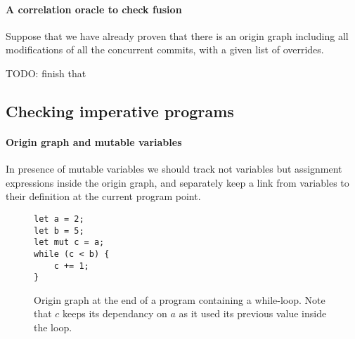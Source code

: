 \documentclass[a4paper,10pt]{article}
\begin{document}
\paragraph{A correlation oracle to check fusion} Suppose that we have already proven that there is an origin graph including all modifications of all the concurrent commits, with a given list of overrides.

TODO: finish that

\subsection{Checking imperative programs}

\paragraph{Origin graph and mutable variables} In presence of mutable variables we should track not variables but assignment expressions inside the origin graph, and separately keep a link from variables to their definition at the current program point.

\begin{figure}[ht]
\begin{minipage}{.5\textwidth}
\begin{lstlisting}
let a = 2;
let b = 5;
let mut c = a;
while (c < b) {
    c += 1;
}
\end{lstlisting}
\end{minipage}\hfill
\begin{minipage}{.45\textwidth}
\centering{}
\end{minipage}
\caption{Origin graph at the end of a program containing a while-loop. Note that $c$ keeps its dependancy on $a$ as it used its previous value inside the loop.}
\end{figure}
\end{document}
